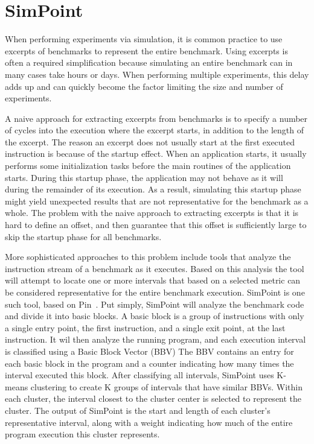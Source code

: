 \section{SimPoint}
\label{sec:background:simpoint}

When performing experiments via simulation, it is common practice to use excerpts of benchmarks to represent the entire benchmark.
Using excerpts is often a required simplification because simulating an entire benchmark can in many cases take hours or days.
When performing multiple experiments, this delay adds up and can quickly become the factor limiting the size and number of experiments.

A naive approach for extracting excerpts from benchmarks is to specify a number of cycles into the execution where the excerpt starts, in addition to the length of the excerpt.
The reason an excerpt does not usually start at the first executed instruction is because of the startup effect.
When an application starts, it usually performs some initialization tasks before the main routines of the application starts.
During this startup phase, the application may not behave as it will during the remainder of its execution.
As a result, simulating this startup phase might yield unexpected results that are not representative for the benchmark as a whole.
The problem with the naive approach to extracting excerpts is that it is hard to define an offset, and then guarantee that this offset is sufficiently large to skip the startup phase for all benchmarks.

More sophisticated approaches to this problem include tools that analyze the instruction stream of a benchmark as it executes.
Based on this analysis the tool will attempt to locate one or more intervals that based on a selected metric can be considered representative for the entire benchmark execution.
SimPoint\cite{Hamerly2005} is one such tool, based on Pin~\cite{Luk2005}.
Put simply, SimPoint will analyze the benchmark code and divide it into basic blocks.
A basic block is a group of instructions with only a single entry point, the first instruction, and a single exit point, at the last instruction.
It wil then analyze the running program, and each execution interval is classified using a Basic Block Vector (BBV)
The BBV contains an entry for each basic block in the program and a counter indicating how many times the interval executed this block.
After classifying all intervals, SimPoint uses K-means clustering to create K groups of intervals that have similar BBVs.
Within each cluster, the interval closest to the cluster center is selected to represent the cluster. 
The output of SimPoint is the start and length of each cluster's representative interval, along with a weight indicating how much of the entire program execution this cluster represents.

